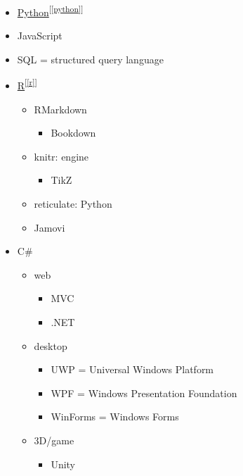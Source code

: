 \documentclass[
]{book}
\providecommand{\tightlist}{%
  \setlength{\itemsep}{0pt}\setlength{\parskip}{0pt}}
\theoremstyle{definition}
\theoremstyle{definition}
\theoremstyle{definition}
\theoremstyle{definition}
\theoremstyle{remark}
\begin{document}
\begin{itemize}
\tightlist
\item
  \protect\hyperlink{python}{Python}\textsuperscript{{[}\ref{python}{]}}
\item
  JavaScript
\item
  SQL = structured query language
\item
  \protect\hyperlink{r}{R}\textsuperscript{{[}\ref{r}{]}}

  \begin{itemize}
  \tightlist
  \item
    RMarkdown

    \begin{itemize}
    \tightlist
    \item
      Bookdown
    \end{itemize}
  \item
    knitr: engine

    \begin{itemize}
    \tightlist
    \item
      TikZ
    \end{itemize}
  \item
    reticulate: Python
  \item
    Jamovi
  \end{itemize}
\item
  C\#

  \begin{itemize}
  \tightlist
  \item
    web

    \begin{itemize}
    \tightlist
    \item
      MVC
    \item
      .NET
    \end{itemize}
  \item
    desktop

    \begin{itemize}
    \tightlist
    \item
      UWP = Universal Windows Platform
    \item
      WPF = Windows Presentation Foundation
    \item
      WinForms = Windows Forms
    \end{itemize}
  \item
    3D/game

    \begin{itemize}
    \tightlist
    \item
      Unity
    \end{itemize}
  \end{itemize}
\end{itemize}
\end{document}
